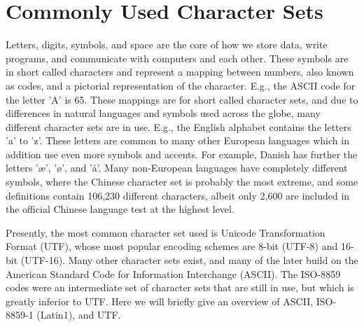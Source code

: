 \chapter{Commonly Used Character Sets}
\label{sec:characterSets}
Letters, digits, symbols, and space are the core of how we store data, write programs, and communicate with computers and each other. These symbols are in short called characters and represent a mapping between numbers, also known as codes, and a pictorial representation of the character. E.g., the ASCII code for the letter 'A' is 65. These mappings are for short called character sets, and due to differences in natural languages and symbols used across the globe, many different character sets are in use. E.g., the English alphabet contains the letters 'a' to 'z'. These letters are common to many other European languages which in addition use even more symbols and accents. For example, Danish has further the letters 'æ', 'ø', and 'å'. Many non-European languages have completely different symbols, where the Chinese character set is probably the most extreme, and some definitions contain 106,230 different characters, albeit only 2,600 are included in the official Chinese language test at the highest level.

Presently, the most common character set used is Unicode Transformation Format (UTF), whose most popular encoding schemes are 8-bit (UTF-8) and 16-bit (UTF-16). Many other character sets exist, and many of the later build on the American Standard Code for Information Interchange (ASCII). The ISO-8859 codes were an intermediate set of character sets that are still in use, but which is greatly inferior to UTF. Here we will briefly give an overview of ASCII, ISO-8859-1 (Latin1), and UTF.

